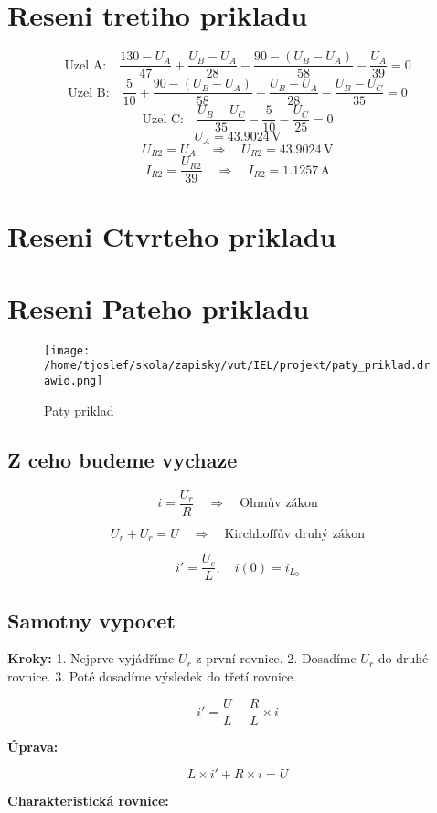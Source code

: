 \documentclass{article}
\begin{document}
\section{Reseni tretiho prikladu}
\[
    \text{Uzel A:} \quad \frac{130 - U_A}{47} + \frac{U_B -U_A}{28} - \frac{90 - (U_B - U_A)}{58} - \frac{U_A}{39} = 0
\]
\[
    \text{Uzel B:} \quad \frac{5}{10} + \frac{90 - (U_B - U_A)}{58} - \frac{U_B - U_A}{28} - \frac{U_B -U_C}{35} = 0
\]
\[
    \text{Uzel C:} \quad \frac{U_B - U_C}{35} - \frac{5}{10} - \frac{U_C}{25} = 0
\]
\[
    U_A = 43.9024 \, \text{V}
\]
\[
    U_{R2} = U_A  \quad \Rightarrow \quad U_{R2} = 43.9024 \, \text{V}
\]
\[
    I_{R2} = \frac{U_{R2}}{39} \quad \Rightarrow \quad I_{R2} = 1.1257 \, \text{A}
\]
\section{Reseni Ctvrteho prikladu}

\section{Reseni Pateho prikladu}
\begin{figure}[!ht]
  \centering
  \texttt{[image: /home/tjoslef/skola/zapisky/vut/IEL/projekt/paty\_priklad.drawio.png]}
  \caption{Paty priklad}
  \label{fig:priklad5}
\end{figure}
\subsection*{Z ceho budeme vychaze}
\[
i = \frac{U_r}{R} \quad \Rightarrow \quad \text{Ohmův zákon}
\]

\[
U_r + U_r = U \quad \Rightarrow \quad \text{Kirchhoffův druhý zákon}
\]

\[
i' = \frac{U_c}{L}, \quad i(0) = i_{L_0}
\]
\subsection*{Samotny vypocet}
\textbf{Kroky:}
1. Nejprve vyjádříme \( U_r \) z první rovnice.
2. Dosadíme \( U_r \) do druhé rovnice.
3. Poté dosadíme výsledek do třetí rovnice.

\[
i' = \frac{U}{L} - \frac{R}{L} \times i
\]

\textbf{Úprava:}

\[
L \times i' + R \times i = U
\]

\textbf{Charakteristická rovnice:}
\end{document}
